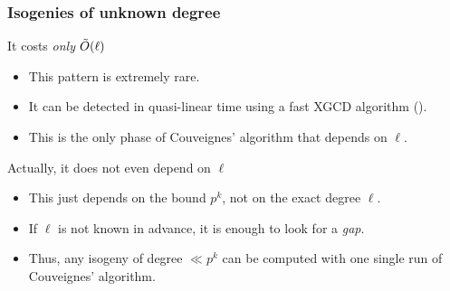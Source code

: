 \documentclass[10pt,usepdftitle=false]{beamer}
\begin{document}
\begin{frame}
  \frametitle{Isogenies of unknown degree}
  
  \large 

  \begin{block}{It costs \textit{only} $\tilde{O}(\ell)$}
    \begin{itemize}
    \item This pattern is extremely rare.
    \item It can be detected in quasi-linear time using a fast XGCD
      algorithm (\cite{khodadad+monagan06}).
    \item This is the only phase of Couveignes' algorithm that depends on $\ell$.
    \end{itemize}
  \end{block}
  
  \pause 

  \begin{block}{Actually, it does not even depend on $\ell$}
    \begin{itemize}
    \item This just depends on the bound $p^k$, not on the exact
      degree $\ell$.
    \item If $\ell$ is not known in advance, it is enough to look
      for a \emph{gap}.
    \item Thus, any isogeny of degree $\ll p^k$ can be computed with
      one single run of Couveignes' algorithm.
    \end{itemize} 
  \end{block} 
\end{frame}

\end{document}

